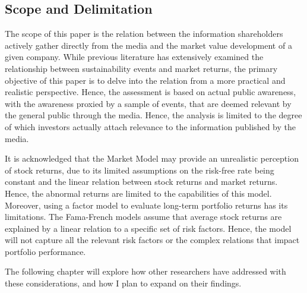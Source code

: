 \subsection{Scope and Delimitation}

The scope of this paper is the relation between the information shareholders actively gather directly from the media and the market value development of a given company. While previous literature has extensively examined the relationship between sustainability events and market returns, the primary objective of this paper is to delve into the relation from a more practical and realistic perspective. Hence, the assessment is based on actual public awareness, with the awareness proxied by a sample of events, that are deemed relevant by the general public through the media. Hence, the analysis is limited to the degree of which investors actually attach relevance to the information published by the media. 

It is acknowledged that the Market Model may provide an unrealistic perception of stock returns, due to its limited assumptions on the risk-free rate being constant and the linear relation between stock returns and market returns. Hence, the abnormal returns are limited to the capabilities of this model. Moreover, using a factor model to evaluate long-term portfolio returns has its limitations. The Fama-French models assume that average stock returns are explained by a linear relation to a specific set of risk factors. Hence, the model will not capture all the relevant risk factors or the complex relations that impact portfolio performance.

The following chapter will explore how other researchers have addressed with these considerations, and how I plan to expand on their findings.   